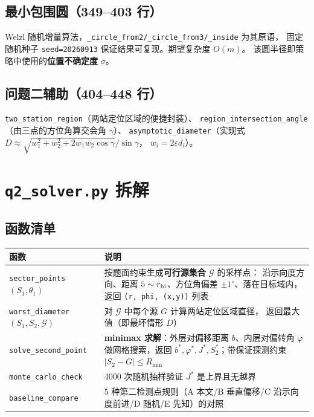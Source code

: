 \subsection{最小包围圆（349--403 行）}

Welzl 随机增量算法，\texttt{\_circle\_from2/\_circle\_from3/\_inside} 为其原语，
固定随机种子 \texttt{seed=20260913} 保证结果可复现。期望复杂度 $O(m)$。
该圆半径即策略中使用的\textbf{位置不确定度} $\sigma$。

\subsection{问题二辅助（404--448 行）}

\texttt{two\_station\_region}（两站定位区域的便捷封装）、
\texttt{region\_intersection\_angle}（由三点的方位角算交会角 $\gamma$）、
\texttt{asymptotic\_diameter}（实现式 $D\approx\sqrt{w_1^2+w_2^2+2w_1w_2\cos\gamma}/\sin\gamma$，
$w_i=2\varepsilon d_i$）。

\section{\texttt{q2\_solver.py} 拆解}

\subsection{函数清单}

\begin{tabular}{p{5.0cm}p{8.8cm}}
\toprule
函数 & 说明 \\ \midrule
\texttt{sector\_points}$(S_1,\theta_1)$ & 按题面约束生成\textbf{可行源集合} $\mathcal G$ 的采样点：
沿示向度方向、距离 $5\sim r_{\rm hi}$、方位角偏差 $\pm1^{\circ}$、落在目标域内，
返回 \texttt{(r, phi, (x,y))} 列表 \\
\texttt{worst\_diameter}$(S_1,S_2,\mathcal G)$ & 对 $\mathcal G$ 中每个源 $G$ 计算两站定位区域直径，
返回最大值（即最坏情形 $D$） \\
\texttt{solve\_second\_point} & \textbf{minimax 求解}：外层对偏移距离 $b$、内层对偏转角 $\varphi$
做网格搜索，返回 $b^{*},\varphi^{*},J^{*},S_2^{*}$；带保证探测约束 $|S_2-G|\le R_{\min}$ \\
\texttt{monte\_carlo\_check} & 4000 次随机抽样验证 $J^{*}$ 是上界且无越界 \\
\texttt{baseline\_compare} & 5 种第二检测点规则（A 本文/B 垂直偏移/C 沿示向度前进/D 随机/E 先知）的对照 \\
\bottomrule
\end{tabular}


